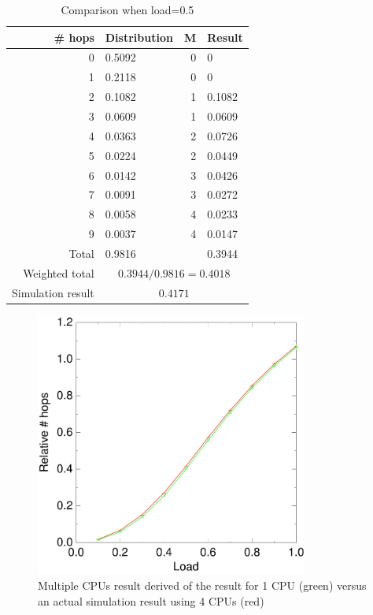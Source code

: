 \documentclass[10pt,a4paper]{article}
\begin{document}
\begin{table}
\centering
\begin{tabular}{|r|l|r|l|} \hline
\# hops & Distribution & M & Result \\ \hline
0 & 0.5092 & 0 & 0 \\ \hline
1 & 0.2118 & 0 & 0 \\ \hline
2 & 0.1082 & 1 & 0.1082 \\ \hline
3 & 0.0609 & 1 & 0.0609 \\ \hline
4 & 0.0363 & 2 & 0.0726 \\ \hline
5 & 0.0224 & 2 & 0.0449 \\ \hline
6 & 0.0142 & 3 & 0.0426 \\ \hline
7 & 0.0091 & 3 & 0.0272 \\ \hline
8 & 0.0058 & 4 & 0.0233 \\ \hline
9 & 0.0037 & 4 & 0.0147 \\ \hline
Total &  0.9816 & &  0.3944 \\ \hline
Weighted total & \multicolumn{3}{|c|}{$0.3944/0.9816 = 0.4018 $} \\ \hline
Simulation result & \multicolumn{3}{|c|}{$0.4171$} \\ \hline
\end{tabular}
\caption{Comparison when load=0.5}
\label{tabcpus}
\end{table}

\begin{figure}[h!tb]
\centering
\includegraphics[width=0.8\textwidth]{data/right_5_2.pdf}
\caption{Multiple CPUs result derived of the result for 1 CPU (green) versus an actual simulation result using 4 CPUs (red)}
\label{figcpusmatch}
\end{figure}
\end{document}
